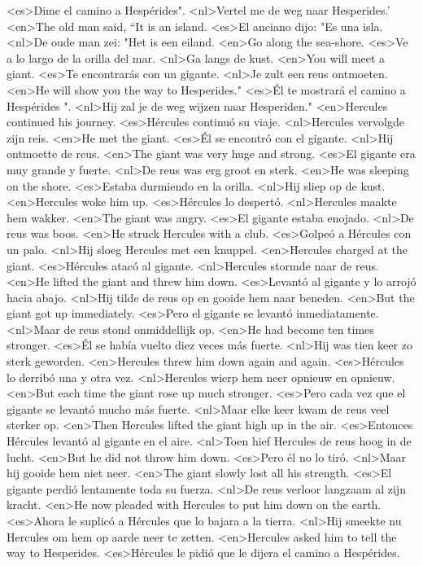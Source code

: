 <es>Dime el camino a Hespérides".
<nl>Vertel me de weg naar Hesperides.'
<en>The old man said, “It is an island.
<es>El anciano dijo: "Es una isla.
<nl>De oude man zei: "Het is een eiland.
<en>Go along the sea-shore.
<es>Ve a lo largo de la orilla del mar.
<nl>Ga langs de kust.
<en>You will meet a giant.
<es>Te encontrarás con un gigante.
<nl>Je zult een reus ontmoeten.
<en>He will show you the way to Hesperides."
<es>Él te mostrará el camino a Hespérides ".
<nl>Hij zal je de weg wijzen naar Hesperiden."
<en>Hercules continued his journey.
<es>Hércules continuó su viaje.
<nl>Hercules vervolgde zijn reis.
<en>He met the giant.
<es>Él se encontró con el gigante.
<nl>Hij ontmoette de reus.
<en>The giant was very huge and strong.
<es>El gigante era muy grande y fuerte.
<nl>De reus was erg groot en sterk.
<en>He was sleeping on the shore.
<es>Estaba durmiendo en la orilla.
<nl>Hij sliep op de kust.
<en>Hercules woke him up.
<es>Hércules lo despertó.
<nl>Hercules maakte hem wakker.
<en>The giant was angry.
<es>El gigante estaba enojado.
<nl>De reus was boos.
<en>He struck Hercules with a club.
<es>Golpeó a Hércules con un palo.
<nl>Hij sloeg Hercules met een knuppel.
<en>Hercules charged at the giant.
<es>Hércules atacó al gigante.
<nl>Hercules stormde naar de reus.
<en>He lifted the giant and threw him down.
<es>Levantó al gigante y lo arrojó hacia abajo.
<nl>Hij tilde de reus op en gooide hem naar beneden.
<en>But the giant got up immediately.
<es>Pero el gigante se levantó inmediatamente.
<nl>Maar de reus stond onmiddellijk op.
<en>He had become ten times stronger.
<es>Él se había vuelto diez veces más fuerte.
<nl>Hij was tien keer zo sterk geworden.
<en>Hercules threw him down again and again.
<es>Hércules lo derribó una y otra vez.
<nl>Hercules wierp hem neer opnieuw en opnieuw.
<en>But each time the giant rose up much stronger.
<es>Pero cada vez que el gigante se levantó mucho más fuerte.
<nl>Maar elke keer kwam de reus veel sterker op.
<en>Then Hercules lifted the giant high up in the air.
<es>Entonces Hércules levantó al gigante en el aire.
<nl>Toen hief Hercules de reus hoog in de lucht.
<en>But he did not throw him down.
<es>Pero él no lo tiró.
<nl>Maar hij gooide hem niet neer.
<en>The giant slowly lost all his strength.
<es>El gigante perdió lentamente toda su fuerza.
<nl>De reus verloor langzaam al zijn kracht.
<en>He now pleaded with Hercules to put him down on the earth.
<es>Ahora le suplicó a Hércules que lo bajara a la tierra.
<nl>Hij smeekte nu Hercules om hem op aarde neer te zetten.
<en>Hercules asked him to tell the way to Hesperides.
<es>Hércules le pidió que le dijera el camino a Hespérides.
